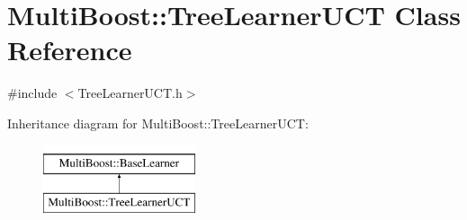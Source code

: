 \hypertarget{classMultiBoost_1_1TreeLearnerUCT}{
\section{MultiBoost::TreeLearnerUCT Class Reference}
\label{classMultiBoost_1_1TreeLearnerUCT}
}


{\ttfamily \#include $<$TreeLearnerUCT.h$>$}

Inheritance diagram for MultiBoost::TreeLearnerUCT:\begin{figure}[H]
\begin{center}
\leavevmode
\includegraphics[height=2.000000cm]{classMultiBoost_1_1TreeLearnerUCT}
\end{center}
\end{figure}
